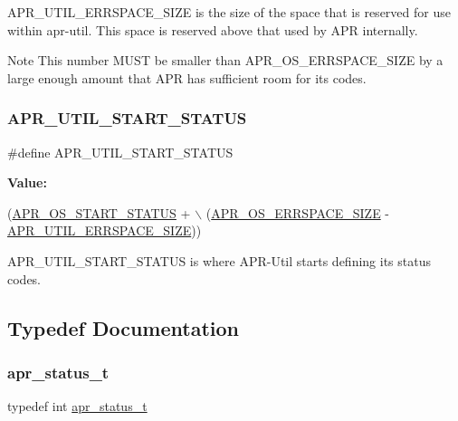 A\+P\+R\+\_\+\+U\+T\+I\+L\+\_\+\+E\+R\+R\+S\+P\+A\+C\+E\+\_\+\+S\+I\+ZE is the size of the space that is reserved for use within apr-\/util. This space is reserved above that used by A\+PR internally. \begin{DoxyNote}{Note}
This number M\+U\+ST be smaller than A\+P\+R\+\_\+\+O\+S\+\_\+\+E\+R\+R\+S\+P\+A\+C\+E\+\_\+\+S\+I\+ZE by a large enough amount that A\+PR has sufficient room for it\textquotesingle{}s codes. 
\end{DoxyNote}
\mbox{\label{group__apr__errno_gadf26297a72afa0ea224e7097fe59a1cd}} 
\subsubsection{\texorpdfstring{A\+P\+R\+\_\+\+U\+T\+I\+L\+\_\+\+S\+T\+A\+R\+T\+\_\+\+S\+T\+A\+T\+US}{APR\_UTIL\_START\_STATUS}}
{\footnotesize\ttfamily \#define A\+P\+R\+\_\+\+U\+T\+I\+L\+\_\+\+S\+T\+A\+R\+T\+\_\+\+S\+T\+A\+T\+US}

{\bfseries Value\+:}
\begin{DoxyCode}
(\mbox{\hyperlink{group__apr__errno_ga450e1a5734732e092ddaa5b67414f69b}{APR\_OS\_START\_STATUS}} + \(\backslash\)
                           (\mbox{\hyperlink{group__apr__errno_gadb8d97e6836ccdc57b43b6119a5acccf}{APR\_OS\_ERRSPACE\_SIZE}} - 
      \mbox{\hyperlink{group__apr__errno_gaef5e79630739f24d1512d0d044c2bae7}{APR\_UTIL\_ERRSPACE\_SIZE}}))
\end{DoxyCode}
A\+P\+R\+\_\+\+U\+T\+I\+L\+\_\+\+S\+T\+A\+R\+T\+\_\+\+S\+T\+A\+T\+US is where A\+P\+R-\/\+Util starts defining it\textquotesingle{}s status codes. 

\subsection{Typedef Documentation}
\mbox{\label{group__apr__errno_gaf76ee4543247e9fb3f3546203e590a6c}} 
\subsubsection{\texorpdfstring{apr\+\_\+status\+\_\+t}{apr\_status\_t}}
{\footnotesize\ttfamily typedef int \mbox{\hyperlink{group__apr__errno_gaf76ee4543247e9fb3f3546203e590a6c}{apr\+\_\+status\+\_\+t}}}

